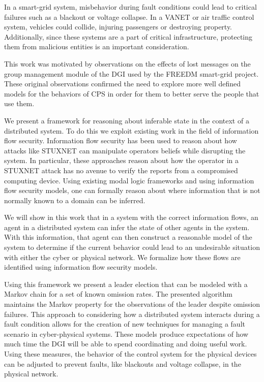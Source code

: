 In a smart-grid system, misbehavior during fault conditions could lead to critical failures such as a blackout or voltage collapse. In a \ac{VANET} or air traffic control system, vehicles could collide, injuring passengers or destroying property. Additionally, since these systems are a part of critical infrastructure, protecting them from malicious entities is an important consideration.

This work was motivated by observations on the effects of lost messages on the group management module of the \ac{DGI} used by the \ac{FREEDM} smart-grid project.
These original observations confirmed the need to explore more well defined models for the behaviors of \ac{CPS} in order for them to better serve the people that use them.

We present a framework for reasoning about inferable state in the context of a distributed system. To do this we exploit existing work in the field of information flow security. Information flow security has been used to reason about how attacks like STUXNET can manipulate operators beliefs while disrupting the system\cite{STUXNET}. In particular, these approaches reason about how the operator in a STUXNET attack has no avenue to verify the reports from a compromised computing device. Using existing modal logic frameworks and using information flow security models\cite{Howser2012}\cite{STUXNET}\cite{Howser2013}, one can formally reason about where information that is not normally known to a domain can be inferred.

We will show in this work that in a system with the correct information flows, an agent in a distributed system can infer the state of other agents in the system. With this information, that agent can then construct a reasonable model of the system to determine if the current behavior could lead to an undesirable situation with either the cyber or physical network. We formalize how these flows are identified using information flow security models.

Using this framework we present a leader election that can be modeled with a Markov chain for a set of known omission rates.
The presented algorithm maintains the Markov property for the observations of the leader despite omission\cite{OMISSIONFAILURES} failures.
This approach to considering how a distributed system interacts during a fault condition allows for the creation of new techniques for managing a fault scenario in cyber-physical systems.
These models produce expectations of how much time the DGI will be able to spend coordinating and doing useful work.
Using these measures, the behavior of the control system for the physical devices can be adjusted to prevent faults, like blackouts and voltage collapse, in the physical network.

